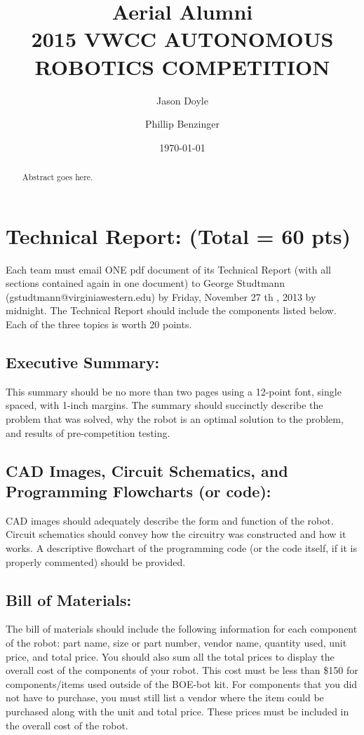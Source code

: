 \documentclass{article}
\title{ Aerial Alumni \\ 2015  VWCC AUTONOMOUS ROBOTICS COMPETITION }
\author{ Jason Doyle \and Phillip Benzinger }
\date{ \today }
\begin{document}
\maketitle

\begin{abstract}
Abstract goes here.
\end{abstract}
\clearpage

\tableofcontents
\listoffigures
\clearpage

\section{ Technical Report: (Total = 60 pts) }
Each team must email ONE pdf document of its Technical Report (with all sections contained again in
one document) to George Studtmann (gstudtmann@virginiawestern.edu) by Friday, November 27 th ,
2013 by midnight. The Technical Report should include the components listed below. Each of the three
topics is worth 20 points.
\subsection{ Executive Summary: }
This summary should be no more than two pages using a 12-point font, single spaced, with 1-inch
margins. The summary should succinctly describe the problem that was solved, why the robot is an optimal
solution to the problem, and results of pre-competition testing.
\subsection{ CAD Images, Circuit Schematics, and Programming Flowcharts (or code): }
CAD images should adequately describe the form and function of the robot. Circuit schematics should
convey how the circuitry was constructed and how it works. A descriptive flowchart of the programming
code (or the code itself, if it is properly commented) should be provided.
\subsection{ Bill of Materials: }
The bill of materials should include the following information for each component of the robot: part
name, size or part number, vendor name, quantity used, unit price, and total price. You should also sum all
the total prices to display the overall cost of the components of your robot. This cost must be less than \$150
for components/items used outside of the BOE-bot kit. For components that you did not have to purchase,
you must still list a vendor where the item could be purchased along with the unit and total price. These
prices must be included in the overall cost of the robot.
\end{document}
